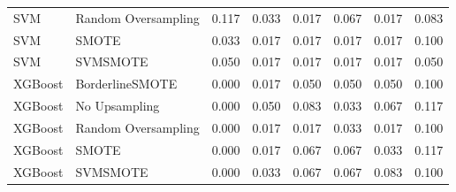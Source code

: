 \begin{tabular}{llllllll}
                         SVM & Random Oversampling & 0.117 &                     0.033 &                 0.017 &                  0.067 &                                   0.017 &    0.083 \\
                         SVM &               SMOTE & 0.033 &                     0.017 &                 0.017 &                  0.017 &                                   0.017 &    0.100 \\
                         SVM &            SVMSMOTE & 0.050 &                     0.017 &                 0.017 &                  0.017 &                                   0.017 &    0.050 \\
                     XGBoost &     BorderlineSMOTE & 0.000 &                     0.017 &                 0.050 &                  0.050 &                                   0.050 &    0.100 \\
                     XGBoost &       No Upsampling & 0.000 &                     0.050 &                 0.083 &                  0.033 &                                   0.067 &    0.117 \\
                     XGBoost & Random Oversampling & 0.000 &                     0.017 &                 0.017 &                  0.033 &                                   0.017 &    0.100 \\
                     XGBoost &               SMOTE & 0.000 &                     0.017 &                 0.067 &                  0.067 &                                   0.033 &    0.117 \\
                     XGBoost &            SVMSMOTE & 0.000 &                     0.033 &                 0.067 &                  0.067 &                                   0.083 &    0.100 \\
\bottomrule
\end{tabular}
